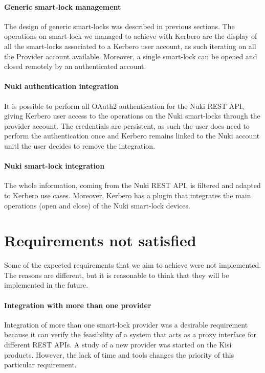 \paragraph{Generic smart-lock management}
The design of generic smart-locks was described in previous sections. The operations on smart-lock we managed to achieve with Kerbero are the display of all the smart-locks associated to a Kerbero user account, as such iterating on all the Provider account available. Moreover, a single smart-lock can be opened and closed remotely by an authenticated account.

\paragraph{Nuki authentication integration}
It is possible to perform all OAuth2 authentication for the Nuki REST API, giving Kerbero user access to the operations on the Nuki smart-locks through the provider account. The credentials are persistent, as such the user does need to perform the authentication once and Kerbero remains linked to the Nuki account unitl the user decides to remove the integration.

\paragraph{Nuki smart-lock integration}
The whole information, coming from the Nuki REST API, is filtered and adapted to Kerbero use cases. Moreover, Kerbero has a plugin that integrates the main operations (open and close) of the Nuki smart-lock devices. 
 
\section{Requirements not satisfied}
Some of the expected requirements that we aim to achieve were not implemented. The reasons are different, but it is reasonable to think that they will be implemented in the future.

\paragraph{Integration with more than one provider}
Integration of more than one smart-lock provider was a desirable requirement because it can verify the feasibility of a system that acts as a proxy interface for different REST APIs. A study of a new provider was started on the Kisi products. However, the lack of time and tools changes the priority of this particular requirement. 

